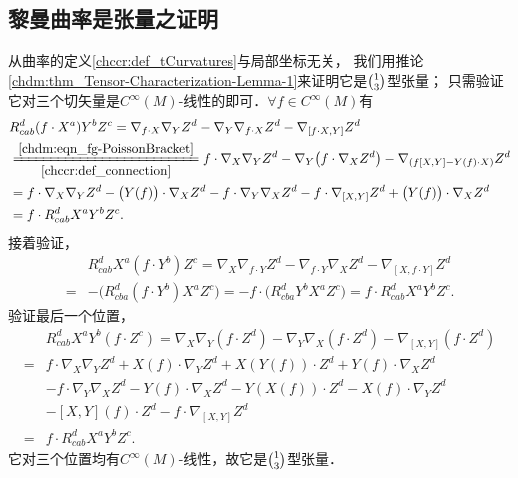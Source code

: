 
\subsection{黎曼曲率是张量之证明}\label{chccr:sec_rit}
从曲率的定义\ref{chccr:def_tCurvatures}与局部坐标无关，
我们用推论\ref{chdm:thm_Tensor-Characterization-Lemma-1}来证明它是$\binom{1}{3}$型张量；
只需验证它对三个切矢量是$C^\infty(M)$-线性的即可．$\forall f\in C^\infty(M)$有
\begin{align*}
    &R_{ cab}^d{(f\cdot X^a)}{Y^b}{Z^c} = {\nabla _{f\cdot X}}{\nabla _Y}{Z^d} -
      {\nabla _Y}{\nabla _{f\cdot X}}{Z^d} - {\nabla _{[f\cdot X,Y]}}{Z^d} \\
    &\xlongequal[\ref{chccr:def_connection}]{\eqref{chdm:eqn_fg-PoissonBracket}}
    f\cdot{\nabla _{X}}{\nabla _Y}{Z^d} - {\nabla _Y}\bigl(f\cdot {\nabla _{ X}}{Z^d} \bigr)
    - {\nabla _{(f[X,Y]- Y(f)\cdot X)}}{Z^d}    \\
    &= f\cdot{\nabla _{X}}{\nabla _Y}{Z^d} - \bigl(Y(f) \bigr)\cdot {\nabla _{ X}}{Z^d}
    - f\cdot {\nabla _Y} {\nabla _{ X}}{Z^d}
     -f\cdot {\nabla _{[X,Y]}}{Z^d} +\bigl(Y(f)\bigr) \cdot{\nabla _{X}}{Z^d} \\
    &=  f\cdot R_{ cab}^d{ X^a}{Y^b}{Z^c} .
\end{align*}
接着验证，
\begin{align*}
    & R_{ cab}^d {X^a}{(f\cdot Y^b)}{Z^c} = {\nabla _{X}}{\nabla _{f \cdot Y}}{Z^d} -
    {\nabla _{f\cdot Y}}{\nabla _{X}}{Z^d} - {\nabla _{[X,f\cdot Y]}}{Z^d} \\
    = & -\bigl( R_{ cba}^d {(f\cdot Y^b)} {X^a}{Z^c} \bigr)
    = -f\cdot \bigl( R_{ cba}^d { Y^b} {X^a}{Z^c} \bigr)
     = f \cdot  R_{ cab}^d {X^a}{ Y^b}{Z^c} .
\end{align*}
验证最后一个位置，
\begin{align*}
    &R_{cab}^d {X^a}{Y^b}{(f\cdot Z^c)} = {\nabla _{X}}{\nabla _{Y}}{(f\cdot Z^d)} -
    {\nabla _{Y}}{\nabla _{X}}{(f\cdot Z^d)} - {\nabla _{[X,Y]}}{(f\cdot Z^d)} \\
    =&f\cdot {\nabla _{X}}{\nabla _{Y}}{Z^d} + {X(f)} \cdot {\nabla _{Y}}{Z^d}
     +X\left(  Y(f)\right) \cdot Z^d +Y(f)\cdot {\nabla _{X}}  Z^d \\
    &-f\cdot {\nabla _{Y}}{\nabla _{X}}{Z^d} - {Y(f)} \cdot {\nabla _{X}}{Z^d}
     -Y\left(  X(f)\right) \cdot Z^d -X(f)\cdot {\nabla _{Y}}  Z^d \\
    & - [X,Y](f) \cdot Z^d - f\cdot {\nabla _{[X,Y]}}{Z^d} \\
    =& f \cdot  R_{ cab}^d {X^a}{ Y^b}{Z^c} .
\end{align*}
它对三个位置均有$C^\infty(M)$-线性，故它是$\binom{1}{3}$型张量．

